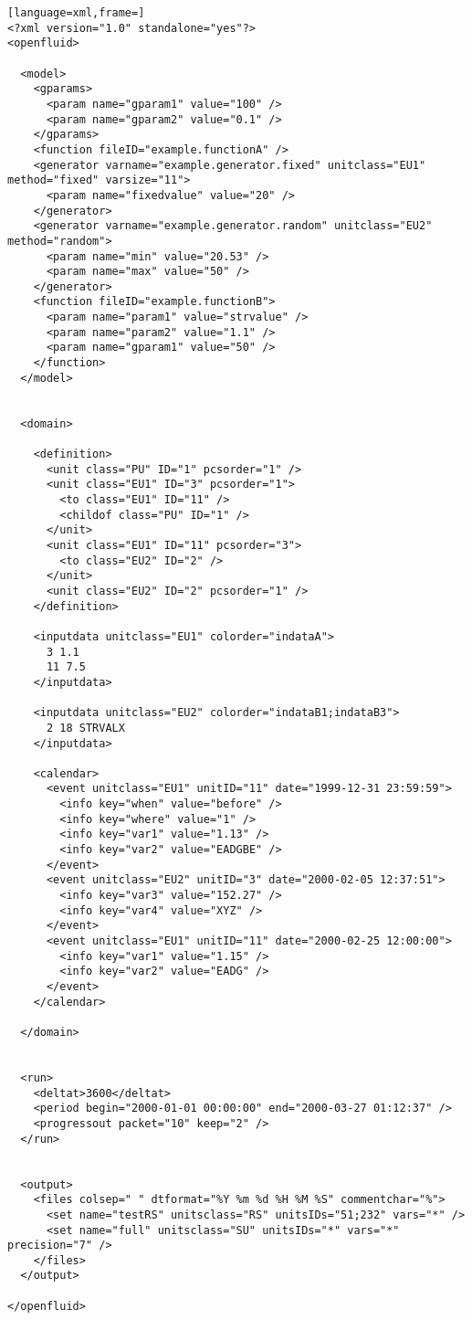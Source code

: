 \begin{lstlisting}[language=xml,frame=]
<?xml version="1.0" standalone="yes"?>
<openfluid>

  <model>
    <gparams>
      <param name="gparam1" value="100" />
      <param name="gparam2" value="0.1" />
    </gparams>
    <function fileID="example.functionA" />
    <generator varname="example.generator.fixed" unitclass="EU1" method="fixed" varsize="11">
      <param name="fixedvalue" value="20" />
    </generator>
    <generator varname="example.generator.random" unitclass="EU2" method="random">
      <param name="min" value="20.53" />
      <param name="max" value="50" />
    </generator>
    <function fileID="example.functionB">
      <param name="param1" value="strvalue" />
      <param name="param2" value="1.1" />
      <param name="gparam1" value="50" />
    </function>
  </model>


  <domain>

    <definition>
      <unit class="PU" ID="1" pcsorder="1" />
      <unit class="EU1" ID="3" pcsorder="1">
        <to class="EU1" ID="11" />
        <childof class="PU" ID="1" />
      </unit>
      <unit class="EU1" ID="11" pcsorder="3">
        <to class="EU2" ID="2" />
      </unit>
      <unit class="EU2" ID="2" pcsorder="1" />
    </definition>

    <inputdata unitclass="EU1" colorder="indataA">
      3 1.1
      11 7.5
    </inputdata>
    
    <inputdata unitclass="EU2" colorder="indataB1;indataB3">
      2 18 STRVALX
    </inputdata>
    
    <calendar>
      <event unitclass="EU1" unitID="11" date="1999-12-31 23:59:59">
        <info key="when" value="before" />
        <info key="where" value="1" />
        <info key="var1" value="1.13" />
        <info key="var2" value="EADGBE" />
      </event>
      <event unitclass="EU2" unitID="3" date="2000-02-05 12:37:51">
        <info key="var3" value="152.27" />
        <info key="var4" value="XYZ" />
      </event>
      <event unitclass="EU1" unitID="11" date="2000-02-25 12:00:00">
        <info key="var1" value="1.15" />
        <info key="var2" value="EADG" />
      </event>
    </calendar>
    
  </domain>


  <run>
    <deltat>3600</deltat>
    <period begin="2000-01-01 00:00:00" end="2000-03-27 01:12:37" />
    <progressout packet="10" keep="2" />
  </run>


  <output>
    <files colsep=" " dtformat="%Y %m %d %H %M %S" commentchar="%">
      <set name="testRS" unitsclass="RS" unitsIDs="51;232" vars="*" />
      <set name="full" unitsclass="SU" unitsIDs="*" vars="*" precision="7" />
    </files>
  </output>

</openfluid>
\end{lstlisting}

